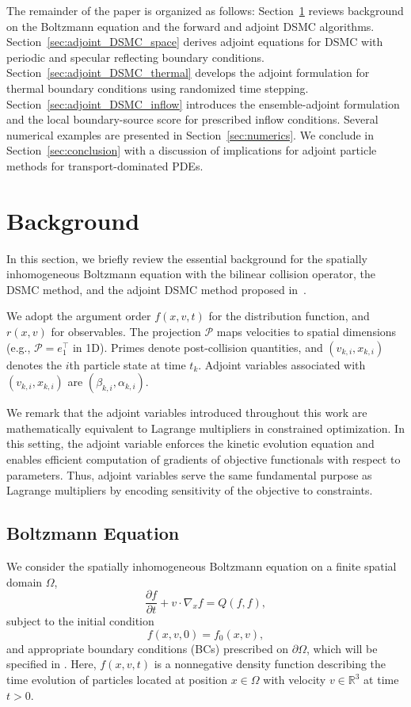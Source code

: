 \documentclass[12pt,nopreprintline]{elsarticle}
\begin{document}
The remainder of the paper is organized as follows: Section~\ref{sec:background} reviews background on the Boltzmann equation and the forward and adjoint DSMC algorithms. Section~\ref{sec:adjoint_DSMC_space} derives adjoint equations for DSMC with periodic and specular reflecting boundary conditions. Section~\ref{sec:adjoint_DSMC_thermal} develops the adjoint formulation for thermal boundary conditions using randomized time stepping. Section~\ref{sec:adjoint_DSMC_inflow} introduces the ensemble-adjoint formulation and the local boundary-source score for prescribed inflow conditions. Several numerical examples are presented in Section~\ref{sec:numerics}. We conclude in Section~\ref{sec:conclusion} with a discussion of implications for adjoint particle methods for transport-dominated PDEs.

\section{Background}\label{sec:background}
In this section, we briefly review the essential background for the spatially inhomogeneous Boltzmann equation with the bilinear collision operator, the DSMC method, and the adjoint DSMC method proposed in~\cite{caflisch2021adjoint,yang2023adjoint,caflisch2024adjoint}.

We adopt the argument order $f(x,v,t)$ for the distribution function, and $r(x,v)$ for observables. The projection $\mathcal P$ maps velocities to spatial dimensions (e.g., $\mathcal P=e_1^\top$ in 1D). Primes denote post-collision quantities, and $(v_{k,i},x_{k,i})$ denotes the $i$th particle state at time $t_k$. Adjoint variables associated with $(v_{k,i},x_{k,i})$ are $(\beta_{k,i},\alpha_{k,i})$.

We remark that the adjoint variables introduced throughout this work are mathematically equivalent to Lagrange multipliers in constrained optimization. In this setting, the adjoint variable enforces the kinetic evolution equation and enables efficient computation of gradients of objective functionals with respect to parameters. Thus, adjoint variables serve the same fundamental purpose as Lagrange multipliers by encoding sensitivity of the objective to constraints.

\subsection{Boltzmann Equation}
We consider the spatially inhomogeneous Boltzmann equation on a finite spatial domain $\Omega$,
\begin{equation}
\label{eq:Boltz1}
\frac{\partial f}{\partial t} + v \cdot \nabla_x f = Q(f,f),
\end{equation}
subject to the initial condition
\begin{equation}
\label{eq:Boltzmann_Initial}
f(x,v,0) = f_0(x,v),
\end{equation}
and appropriate boundary conditions (BCs) prescribed on $\partial \Omega$, which will be specified in . Here, $f(x,v,t)$ is a nonnegative density function describing the time evolution of particles located at position $x \in \Omega$ with velocity $v \in \mathbb{R}^3$ at time $t>0$.
\end{document}
